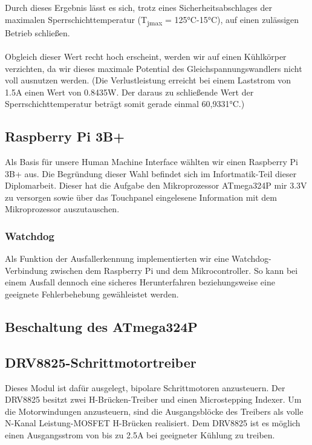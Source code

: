 Durch dieses Ergebnis lässt es sich, trotz eines Sicherheitsabschlages der maximalen Sperrschichttemperatur (T\textsubscript{jmax} = 125°C-15°C), auf einen zulässigen Betrieb schließen.\\\\
Obgleich dieser Wert recht hoch erscheint, werden wir auf einen Kühlkörper verzichten, da wir dieses maximale Potential des Gleichspannungswandlers nicht voll ausnutzen werden.
(Die Verlustleistung erreicht bei einem Laststrom von 1.5A einen Wert von 0.8435W. Der daraus zu schließende Wert der Sperrschichttemperatur beträgt somit gerade einmal 60,9331°C.)

\subsection{Raspberry Pi 3B+}

Als Basis für unsere Human Machine Interface wählten wir einen Raspberry Pi 3B+ aus.
Die Begründung dieser Wahl befindet sich im Infortmatik-Teil dieser Diplomarbeit.
Dieser hat die Aufgabe den Mikroprozessor ATmega324P mir 3.3V zu versorgen sowie über das Touchpanel eingelesene Information mit dem Mikroprozessor auszutauschen.

\subsubsection{Watchdog}

Als Funktion der Ausfallerkennung implementierten wir eine Watchdog-Verbindung zwischen dem Raspberry Pi und dem Mikrocontroller.
So kann bei einem Ausfall dennoch eine sicheres Herunterfahren beziehungsweise eine geeignete Fehlerbehebung gewähleistet werden.

\subsection{Beschaltung des ATmega324P}


\subsection{DRV8825-Schrittmotortreiber}

Dieses Modul ist dafür ausgelegt, bipolare Schrittmotoren anzusteuern.
Der DRV8825 besitzt zwei H-Brücken-Treiber und einen Microstepping Indexer.
Um die Motorwindungen anzusteuern, sind die Ausgangsblöcke des Treibers als volle N-Kanal Leistung-MOSFET H-Brücken realisiert.
Dem DRV8825 ist es möglich einen Ausgangsstrom von bis zu 2.5A bei geeigneter Kühlung zu treiben.


